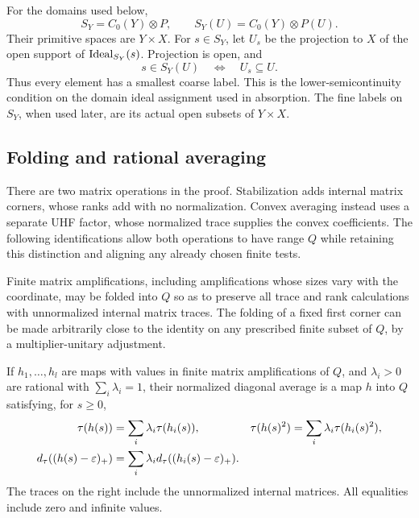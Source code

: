 For the domains used below,
\[
 S_Y=C_0(Y)\otimes P,
 \qquad S_Y(U)=C_0(Y)\otimes P(U).
\]
Their primitive spaces are \(Y\times X\). For \(s\in S_Y\),
let \(U_s\) be the projection to \(X\) of the open support of
\(\operatorname{Ideal}_{S_Y}(s)\). Projection is open, and
\begin{equation}\label{st:smallest-label}
 s\in S_Y(U)\quad\Longleftrightarrow\quad U_s\subseteq U.
\end{equation}
Thus every element has a smallest coarse label. This is the
lower-semicontinuity condition on the domain ideal assignment used
in absorption. The fine labels on \(S_Y\), when used later, are
its actual open subsets of \(Y\times X\).

\subsection{Folding and rational averaging}

There are two matrix operations in the proof. Stabilization adds
internal matrix corners, whose ranks add with no normalization.
Convex averaging instead uses a separate UHF factor, whose normalized
trace supplies the convex coefficients. The following identifications
allow both operations to have range \(Q\) while retaining this
distinction and aligning any already chosen finite tests.

\begin{lemma}\label{st:folding}
Finite matrix amplifications, including amplifications whose sizes
vary with the coordinate, may be folded into \(Q\) so as to preserve
all trace and rank calculations with unnormalized internal matrix
traces. The folding of a fixed first corner can be made arbitrarily
close to the identity on any prescribed finite subset of \(Q\),
by a multiplier-unitary adjustment.

If \(h_1,\ldots,h_l\) are \cpc maps with values in finite matrix
amplifications of \(Q\), and \(\lambda_i>0\) are rational with
\(\sum_i\lambda_i=1\), their normalized diagonal average is a
\cpc map \(h\) into \(Q\) satisfying, for \(s\geq0\),
\begin{align}
 \tau(h(s))&=\sum_i\lambda_i\tau(h_i(s)),
 &\tau(h(s)^2)&=\sum_i\lambda_i\tau(h_i(s)^2),
 \label{st:average-traces}\\
 d_\tau((h(s)-\varepsilon)_+)
 &=\sum_i\lambda_i d_\tau((h_i(s)-\varepsilon)_+).
 \label{st:average-ranks}
\end{align}
The traces on the right include the unnormalized internal matrices.
All equalities include zero and infinite values.
\end{lemma}

